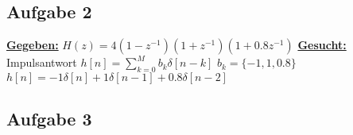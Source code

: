 \documentclass[12pt]{scrreprt}
\begin{document}
\subsection*{Aufgabe 2}
\underline{\textbf{Gegeben:}}\newline
\hspace*{5mm}$H(z)=4(1-z^{-1})(1+z^{-1})(1+0.8z^{-1})$\newline
\newline
\underline{\textbf{Gesucht:}}\newline
\hspace*{5mm}Impulsantwort $h[n]=\sum_{k=0}^{M} b_k \delta[n-k]$\newline
\hspace*{5mm}$b_k=\{-1, 1, 0.8\}$\newline
\hspace*{5mm}$h[n]=-1\delta[n]+1\delta[n-1]+0.8\delta[n-2]$

\subsection*{Aufgabe 3}
\end{document}
